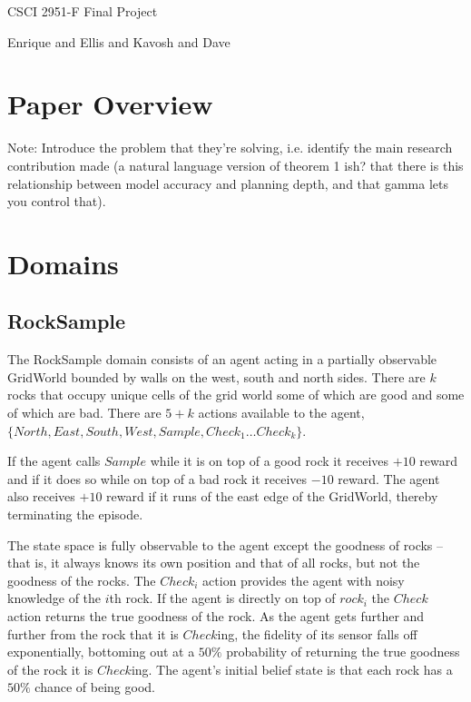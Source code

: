 \documentclass[11pt]{article} %
\begin{document}
\centerline{\LARGE{CSCI 2951-F Final Project}}
\centerline{Enrique and Ellis and Kavosh and Dave}
\vspace{2mm}


\section{Paper Overview}

Note: Introduce the problem that they're solving, i.e. identify the main research contribution made (a natural language version of theorem 1 ish? that there is this relationship between model accuracy and planning depth, and that gamma lets you control that).


\section{Domains}

\subsection{RockSample}
The RockSample domain consists of an agent acting in a partially observable GridWorld bounded by walls on the west, south and north sides. There are $k$ rocks that occupy unique cells of the grid world some of which are good and some of which are bad. There are $5+k$ actions available to the agent, $\{North, East, South, West, Sample, Check_1 \ldots Check_k\}$. 

If the agent calls $Sample$ while it is on top of a good rock it receives $+10$ reward and if it does so while on top of a bad rock it receives $-10$ reward. The agent also receives $+10$ reward if it runs of the east edge of the GridWorld, thereby terminating the episode.

The state space is fully observable to the agent except the goodness of rocks -- that is, it always knows its own position and that of all rocks, but not the goodness of the rocks. The $Check_i$ action provides the agent with noisy knowledge of the $i$th rock. If the agent is directly on top of $rock_i$ the $Check$ action returns the true goodness of the rock. As the agent gets further and further from the rock that it is $Check$ing, the fidelity of its sensor falls off exponentially, bottoming out at a $50\%$ probability of returning the true goodness of the rock it is $Check$ing. The agent's initial belief state is that each rock has a $50\%$ chance of being good.
\end{document}
